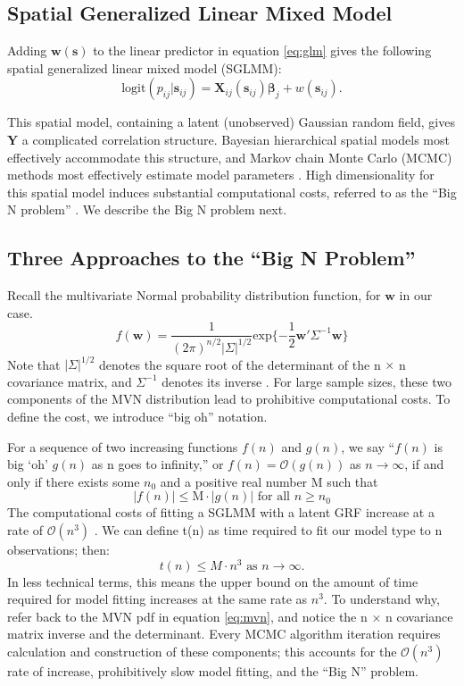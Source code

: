\subsection{Spatial Generalized Linear Mixed Model}
Adding $\pmb{w}(\pmb{s})$ to the linear predictor in equation \ref{eq:glm} gives the following spatial generalized linear mixed model (SGLMM):
\begin{equation} \label{eq:SGLMM}
\text{logit}(p_{ij}|\pmb{s}_{ij}) = \pmb{X}_{ij}(\pmb{s}_{ij}) \pmb{\beta}_{j} + w(\pmb{s}_{ij}).
\end{equation}

This spatial model, containing a latent (unobserved) Gaussian random field, gives $\pmb{Y}$ a complicated correlation structure. Bayesian hierarchical spatial models most effectively accommodate this structure, and Markov chain Monte Carlo (MCMC) methods most effectively estimate model parameters \citep{Banerjee2014}. High dimensionality for this spatial model induces substantial computational costs, referred to as the ``Big N problem'' \citep{Lindgren2011}. We describe the Big N problem next.

\subsection{Three Approaches to the ``Big N Problem''}

Recall the multivariate Normal probability distribution function, for $\pmb{w}$ in our case.
\begin{equation} \label{eq:mvn}
f(\pmb{w}) = \frac{1}{(2\pi)^{n/2}|\Sigma|^{1/2}} \text{exp}\{ -\frac{1}{2}\pmb{w}'\Sigma^{-1}\pmb{w} \}
\end{equation}
Note that $|\Sigma|^{1/2}$ denotes the square root of the determinant of the n $\times$ n covariance matrix, and $\Sigma^{-1}$ denotes its inverse \citep{Lay}. For large sample sizes, these two components of the MVN distribution lead to prohibitive computational costs. To define the cost, we introduce ``big oh'' notation. 

For a sequence of two increasing functions $f(n)$ and $g(n)$, we say ``$f(n)$ is big `oh' $g(n)$ as n goes to infinity,'' or $f(n) = \mathcal{O}(g(n))$ as $n \rightarrow \infty$, if and only if there exists some $n_{0}$ and a positive real number M such that
  $$|f(n)| \leq \text{M} \cdot |g(n)| \text{ for all } n \geq n_0 $$
The computational costs of fitting a SGLMM with a latent GRF increase at a rate of $\mathcal{O}(n^{3})$ \citep{Finley2009}. We can define t(n) as time required to fit our model type to n observations; then:
$$t(n) \leq M \cdot n^{3} \text{ as } n \rightarrow \infty.$$
In less technical terms, this means the upper bound on the amount of time required for model fitting increases at the same rate as $n^{3}$. To understand why, refer back to the MVN pdf in equation \ref{eq:mvn}, and notice the n $\times$ n covariance matrix inverse and the determinant. Every MCMC algorithm iteration requires calculation and construction of these components; this accounts for the $\mathcal{O}(n^{3})$ rate of increase, prohibitively slow model fitting, and the ``Big N'' problem. 

